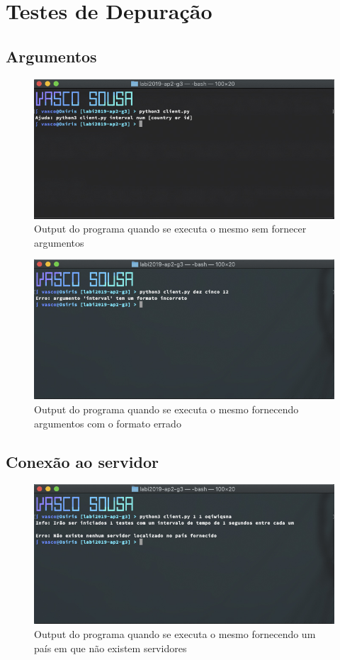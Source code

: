 \documentclass{report}
\begin{document}
\chapter{Testes de Depuração}
\label{chap.testes}
\section{Argumentos}
\begin{figure}[h!]
    \includegraphics[width=\linewidth]{ss1.jpg}
    \caption{Output do programa quando se executa o mesmo sem fornecer argumentos }
    \label{fig:noarguments}
\end{figure}
\begin{figure}[h!]
    \includegraphics[width=\linewidth]{ss2.jpg}
    \caption{Output do programa quando se executa o mesmo fornecendo argumentos com o formato errado }
    \label{fig:wrongarguments}
\end{figure}

\newpage
\section{Conexão ao servidor}
\begin{figure}[h!]
    \includegraphics[width=\linewidth]{ss3.jpg}
    \caption{Output do programa quando se executa o mesmo fornecendo um país em que não existem servidores }
    \label{fig:wrongcountry}
\end{figure}
\end{document}
